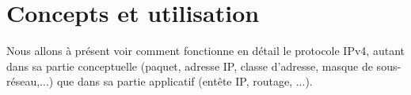
\section{Concepts et utilisation}

Nous allons à présent voir comment fonctionne en détail le protocole IPv4,
autant dans sa partie conceptuelle (paquet, adresse IP, classe d'adresse,
masque de sous-réseau,...) que dans sa partie applicatif (entête IP, routage,
...).



